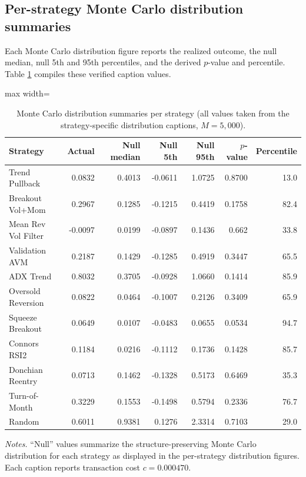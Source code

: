 \documentclass[preprint,12pt]{elsarticle}
\theoremstyle{definition}
\begin{document}
\subsection{Per-strategy Monte Carlo distribution summaries}

Each Monte Carlo distribution figure reports the realized outcome, the null median, null 5th and 95th percentiles, and the derived $p$-value and percentile. Table \ref{tab:mc} compiles these verified caption values.

\clearpage
\begin{table}[p]
\centering
\caption{Monte Carlo distribution summaries per strategy (all values taken from the strategy-specific distribution captions, $M=5{,}000$).}
\label{tab:mc}
{\small
\renewcommand{\arraystretch}{1.15}
\setlength{\tabcolsep}{6pt}
\begin{adjustbox}{max width=\textwidth}
\begin{tabular}{@{}lrrrrrr@{}}
\toprule
Strategy & Actual & Null median & Null 5th & Null 95th & $p$-value & Percentile \\
\midrule
Trend Pullback      & 0.0832 & 0.4013 & -0.0611 & 1.0725 & 0.8700 & 13.0 \\
Breakout Vol+Mom    & 0.2967 & 0.1285 & -0.1215 & 0.4419 & 0.1758 & 82.4 \\
Mean Rev Vol Filter & -0.0097 & 0.0199 & -0.0897 & 0.1436 & 0.662\phantom{0} & 33.8 \\
Validation AVM      & 0.2187 & 0.1429 & -0.1285 & 0.4919 & 0.3447 & 65.5 \\
ADX Trend           & 0.8032 & 0.3705 & -0.0928 & 1.0660 & 0.1414 & 85.9 \\
Oversold Reversion  & 0.0822 & 0.0464 & -0.1007 & 0.2126 & 0.3409 & 65.9 \\
Squeeze Breakout    & 0.0649 & 0.0107 & -0.0483 & 0.0655 & 0.0534 & 94.7 \\
Connors RSI2        & 0.1184 & 0.0216 & -0.1112 & 0.1736 & 0.1428 & 85.7 \\
Donchian Reentry    & 0.0713 & 0.1462 & -0.1328 & 0.5173 & 0.6469 & 35.3 \\
Turn-of-Month       & 0.3229 & 0.1553 & -0.1498 & 0.5794 & 0.2336 & 76.7 \\
Random              & 0.6011 & 0.9381 & \phantom{-}0.1276 & 2.3314 & 0.7103 & 29.0 \\
\bottomrule
\end{tabular}
\end{adjustbox}
}
\par\vspace{0.75em}
\begin{minipage}{0.95\textwidth}
\centering
\footnotesize\emph{Notes.} ``Null'' values summarize the structure-preserving Monte Carlo distribution for each strategy as displayed in the per-strategy distribution figures. Each caption reports transaction cost $c=0.000470$.
\end{minipage}
\end{table}
\clearpage
\end{document}
